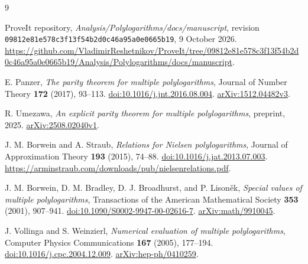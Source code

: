 \begin{thebibliography}{9}
\raggedright

ProveIt repository, \emph{Analysis/Polylogarithms/docs/manuscript},
revision \texttt{09812e81e578c3f13f54b2d0c46a95a0e0665b19},
9 October 2026.
\url{https://github.com/VladimirReshetnikov/ProveIt/tree/09812e81e578c3f13f54b2d0c46a95a0e0665b19/Analysis/Polylogarithms/docs/manuscript}.

E. Panzer, \emph{The parity theorem for multiple polylogarithms},
Journal of Number Theory \textbf{172} (2017), 93--113.
\href{https://doi.org/10.1016/j.jnt.2016.08.004}{doi:10.1016/j.jnt.2016.08.004}.
\href{https://arxiv.org/abs/1512.04482v3}{arXiv:1512.04482v3}.

R. Umezawa, \emph{An explicit parity theorem for multiple polylogarithms},
preprint, 2025.
\href{https://arxiv.org/abs/2508.02040v1}{arXiv:2508.02040v1}.

J. M. Borwein and A. Straub, \emph{Relations for Nielsen polylogarithms},
Journal of Approximation Theory \textbf{193} (2015), 74--88.
\href{https://doi.org/10.1016/j.jat.2013.07.003}{doi:10.1016/j.jat.2013.07.003}.
\url{https://arminstraub.com/downloads/pub/nielsenrelations.pdf}.

J. M. Borwein, D. M. Bradley, D. J. Broadhurst, and P. Lison\v ek,
\emph{Special values of multiple polylogarithms},
Transactions of the American Mathematical Society \textbf{353} (2001),
907--941.
\href{https://doi.org/10.1090/S0002-9947-00-02616-7}{doi:10.1090/S0002-9947-00-02616-7}.
\href{https://arxiv.org/abs/math/9910045}{arXiv:math/9910045}.

J. Vollinga and S. Weinzierl, \emph{Numerical evaluation of multiple
polylogarithms}, Computer Physics Communications \textbf{167} (2005),
177--194.
\href{https://doi.org/10.1016/j.cpc.2004.12.009}{doi:10.1016/j.cpc.2004.12.009}.
\href{https://arxiv.org/abs/hep-ph/0410259}{arXiv:hep-ph/0410259}.

\end{thebibliography}
